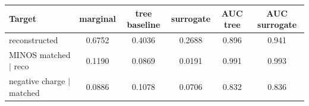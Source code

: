 \begin{tabular}{lccccc}
\toprule
Target & marginal & tree baseline & surrogate & AUC tree & AUC surrogate \\
\midrule
reconstructed & 0.6752 & 0.4036 & 0.2688 & 0.896 & 0.941 \\
MINOS matched $\mid$ reco & 0.1190 & 0.0869 & 0.0191 & 0.991 & 0.993 \\
negative charge $\mid$ matched & 0.0886 & 0.1078 & 0.0706 & 0.832 & 0.836 \\
\bottomrule
\end{tabular}
